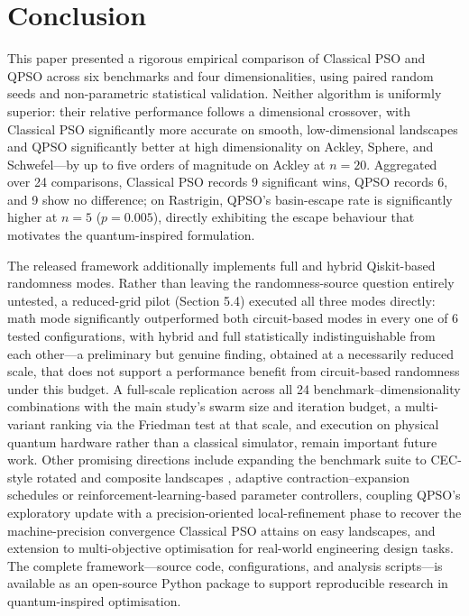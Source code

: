 \documentclass[11pt]{article}
\begin{document}
\section{Conclusion}
This paper presented a rigorous empirical comparison of Classical PSO and QPSO across six benchmarks and four dimensionalities, using paired random seeds and non-parametric statistical validation. Neither algorithm is uniformly superior: their relative performance follows a dimensional crossover, with Classical PSO significantly more accurate on smooth, low-dimensional landscapes and QPSO significantly better at high dimensionality on Ackley, Sphere, and Schwefel---by up to five orders of magnitude on Ackley at $n=20$. Aggregated over 24 comparisons, Classical PSO records 9 significant wins, QPSO records 6, and 9 show no difference; on Rastrigin, QPSO's basin-escape rate is significantly higher at $n=5$ ($p=0.005$), directly exhibiting the escape behaviour that motivates the quantum-inspired formulation.

The released framework additionally implements full and hybrid Qiskit-based randomness modes. Rather than leaving the randomness-source question entirely untested, a reduced-grid pilot (Section 5.4) executed all three modes directly: math mode significantly outperformed both circuit-based modes in every one of 6 tested configurations, with hybrid and full statistically indistinguishable from each other---a preliminary but genuine finding, obtained at a necessarily reduced scale, that does not support a performance benefit from circuit-based randomness under this budget. A full-scale replication across all 24 benchmark--dimensionality combinations with the main study's swarm size and iteration budget, a multi-variant ranking via the Friedman test at that scale, and execution on physical quantum hardware rather than a classical simulator, remain important future work. Other promising directions include expanding the benchmark suite to CEC-style rotated and composite landscapes \cite{liang2013}, adaptive contraction--expansion schedules or reinforcement-learning-based parameter controllers, coupling QPSO's exploratory update with a precision-oriented local-refinement phase to recover the machine-precision convergence Classical PSO attains on easy landscapes, and extension to multi-objective optimisation for real-world engineering design tasks. The complete framework---source code, configurations, and analysis scripts---is available as an open-source Python package to support reproducible research in quantum-inspired optimisation.
\end{document}
